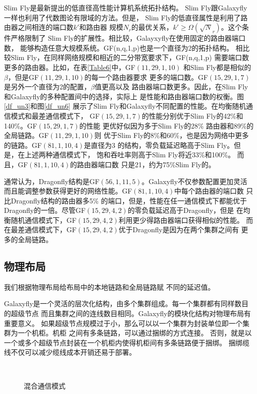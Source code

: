 Slim Fly是最新提出的低直径高性能计算机系统拓扑结构。
Slim Fly跟Galaxyfly一样也利用了代数图论有限域的方法。但是，
Slim Fly的低直径属性是利用了路由器之间相连的端口数$k'$和路由器
规模$N_r$的最优关系，$k'\geq\Omega(\sqrt N_r)$。这个条件严格限制了
Slim Fly的扩展性。相比较，Galayxyfly在使用固定的路由器端口数，
能够构造任意大规模系统。GF(n,q,1,p)也是一个直径为2的拓扑结构。
相比较Slim Fly，在同样网络规模和相近的二分带宽要求下，GF(n,q,1,p)
需要端口数更多的路由器。比如，在表\ref{Table6}中，GF$(11,29,1,10)$
和Slim Fly都是相似的$\beta$，但是GF$(11,29,1,10)$的每一个路由器要求
更多的端口数。GF$(15,29,1,7)$ 是另外一个直径为2的配置，$\beta$值更高以及
路由器端口数更多。因此，在Slim Fly和Galaxyfly的多种配置间中的选择，实际上
是性能和路由器端口数的权衡。图\ref{df_un3}和图\ref{df_un6}
展示了Slim Fly和Galaxyfly不同配置的性能。在均衡随机通信模式和最差通信模式下，
GF$(15,29,1,7)$的性能分别优于Slim Fly的42\%和140\%。GF$(15,29,1,7)$的性能
更优好似因为多于Slim Fly的28\% 路由器和89\%的全局链路。GF$(11,29,1,10)$则
优于Slim Fly的8\%和60\%，也是因为网络中更多的链路。GF$(81,1,10,4)$是直径为3
的结构，零负载延迟略高于Slim Fly。但是，在上述两种通信模式下，
饱和吞吐率则高于Slim Fly将近33\%和100\%。 而且，GF$(81,1,10,4)$的路由器端口数
只是21，约为75\%Slim Fly的。

通常认为，Dragonfly结构是GF$(56,1,11,5)$。Galaxyfly不仅参数配置更加灵活
而且能调整参数获得更好的网络性能。GF$(81,1,10,4)$中每个路由器的端口数
只比Dragonfly结构的路由器多5\% 的端口，但是，性能在任一通信模式下都能优于
Dragonfly的一倍。尽管GF$(15,29,4,2)$的零负载延迟高于Dragonfly，但是
在均衡随机通信模式下，GF$(15,29,4,2)$利用更少得路由器端口获得相似的性能。
而在最差通信模式下，GF$(15,29,4,2)$优于Dragonfly是因为在两个集群之间有
更多的全局链路。

\subsection{物理布局}

我们根据物理布局给布局中的本地链路和全局链路赋
不同的延迟值。

Galaxyfly是一个灵活的层次化结构，由多个集群组成。每一个集群都有同样数目的超级节点
而且集群之间的连线数目相同。Galaxyfly的模块化结构对物理布局有重要意义。
如果超级节点规模过于小，那么可以以一个集群为封装单位即一个集群为一个机柜。机柜
之间有多条链路，可以通过捆绑的方式连接。
否则，就是以一个或多个超级节点封装在一个机柜内使得机柜间有多条链路便于捆绑。
捆绑缆线不仅可以减少缆线成本开销还易于部署。


\begin{figure*}[t]
 \begin{minipage}[t]{\textwidth}
   \centering
   \\
  \caption{混合通信模式}
  \label{fig:Figure14}
  \end{minipage}
\end{figure*}


